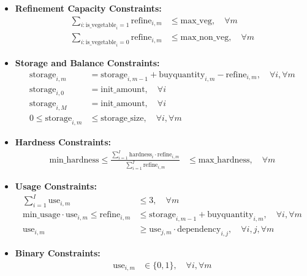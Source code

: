 \documentclass{article}
\begin{document}
\begin{itemize}
\item \textbf{Refinement Capacity Constraints:}
\begin{align*}
\sum_{i: \text{is\_vegetable}_i = 1} \text{refine}_{i, m} & \leq \text{max\_veg}, \quad \forall m \\
\sum_{i: \text{is\_vegetable}_i = 0} \text{refine}_{i, m} & \leq \text{max\_non\_veg}, \quad \forall m 
\end{align*}

\item \textbf{Storage and Balance Constraints:}
\begin{align*}
\text{storage}_{i, m} &= \text{storage}_{i, m-1} + \text{buyquantity}_{i, m} - \text{refine}_{i, m}, \quad \forall i, \forall m \\
\text{storage}_{i, 0} &= \text{init\_amount}, \quad \forall i \\
\text{storage}_{i, M} &= \text{init\_amount}, \quad \forall i \\
0 \leq \text{storage}_{i, m} & \leq \text{storage\_size}, \quad \forall i, \forall m 
\end{align*}

\item \textbf{Hardness Constraints:}
\begin{align*}
\text{min\_hardness} \leq \frac{\sum_{i=1}^{I} \text{hardness}_{i} \cdot \text{refine}_{i, m}}{\sum_{i=1}^{I} \text{refine}_{i, m}} & \leq \text{max\_hardness}, \quad \forall m
\end{align*}

\item \textbf{Usage Constraints:}
\begin{align*}
\sum_{i=1}^{I} \text{use}_{i, m} & \leq 3, \quad \forall m \\
\text{min\_usage} \cdot \text{use}_{i, m} \leq \text{refine}_{i, m} & \leq \text{storage}_{i, m-1} + \text{buyquantity}_{i, m}, \quad \forall i, \forall m \\
\text{use}_{i, m} & \geq \text{use}_{j, m} \cdot \text{dependency}_{i, j}, \quad \forall i, j, \forall m
\end{align*}

\item \textbf{Binary Constraints:}
\begin{align*}
\text{use}_{i, m} & \in \{0, 1\}, \quad \forall i, \forall m
\end{align*}
\end{itemize}
\end{document}
